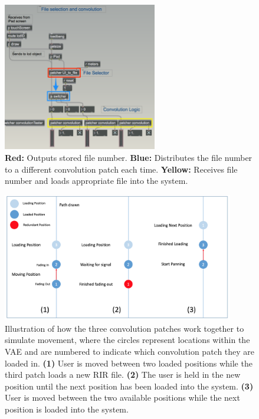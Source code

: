 \documentclass[../../main.tex]{subfiles}
\begin{document}
			\begin{figure}[H]
				\centerline{\includegraphics[width=0.6\textwidth]{Sections/Implementation/Max/images/Max/Iteration3/fileSelectionConvolution_Edit.png}}
				\caption{\textbf{Red:} Outputs stored file number. \textbf{Blue:} Distributes the file number to a different convolution patch each time. \textbf{Yellow:} Receives file number and loads appropriate file into the system.}
				\label{overviewIteration3}
			\end{figure}

			\begin{figure}
				\centerline{\includegraphics[width=0.9\textwidth]{Sections/Implementation/Max/images/Max/Iteration3/movementIllustration2.png}}
				\caption{Illustration of how the three convolution patches work together to simulate movement, where the circles represent locations within the \ac{VAE} and are numbered to indicate which convolution patch they are loaded in. \textbf{(1)} User is moved between two loaded positions while the third patch loads a new \ac{RIR} file. \textbf{(2)} The user is held in the new position until the next position has been loaded into the system. \textbf{(3)} User is moved between the two available positions while the next position is loaded into the system.}
				\label{movementIllustration}
			\end{figure}
\end{document}
